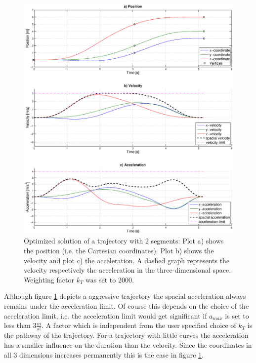 \begin{figure}[H]
   \centering
   \includegraphics[trim = 35mm 30mm 30mm 15mm,clip,width=1\textwidth]{pics/2SegOpti5s16k2000.eps}
   \caption{Optimized solution of a trajectory with 2 segments: Plot a) shows the position (i.e. the Cartesian coordinates). Plot b) shows the velocity and plot c) the acceleration. A dashed graph represents the velocity respectively the acceleration in the three-dimensional space. Weighting factor $k_T$ was set to 2000.}
   \label{pic:optimizedSolution2k2000}
\end{figure}


Although figure \ref{pic:optimizedSolution2k2000} depicts a aggressive trajectory the spacial acceleration always remains under the acceleration limit. Of course this depends on the choice of the acceleration limit, i.e. the acceleration limit would get significant if $a_{max}$ is set to less than $3 \frac{m}{s^2}$.
A factor which is independent from the user specified choice of $k_T$ is the pathway of the trajectory. For a trajectory with little curves the acceleration has a smaller influence on the duration than the velocity. Since the coordinates in all 3 dimensions increases permanently this is the case in figure \ref{pic:optimizedSolution2k2000}. \newline



